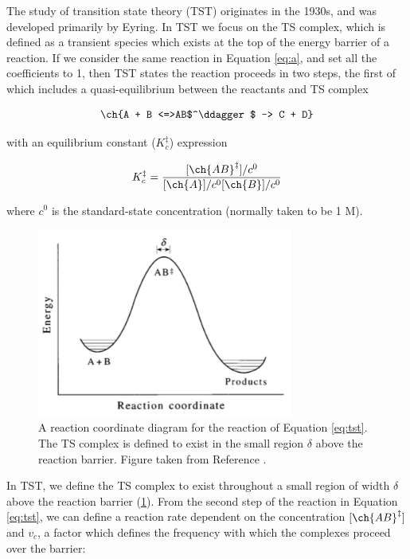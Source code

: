 The study of transition state theory (TST) originates in the 1930s, and was
developed primarily by Eyring.\cite{McQuarrie1997,Steinfeld1998} In TST we focus
on the TS complex, which is defined as a transient species which exists at the
top of the energy barrier of a reaction. If we consider the same reaction in
Equation \ref{eq:a}, and set all the coefficients to 1, then TST states the
reaction proceeds in two steps, the first of which includes a quasi-equilibrium
between the reactants and TS complex

\begin{equation}
  \ch{A + B <=>AB$^\ddagger$ -> C + D}
  \label{eq:tst}
\end{equation}

\noindent with an equilibrium constant ($K_c^{\ddagger}$) expression

\begin{equation}
  K_c^{\ddagger} = \frac{[\ch{AB}^\ddagger]/c^0}{[\ch{A}]/c^0[\ch{B}]/c^0}
\label{eq:K}
\end{equation}

\noindent where $c^0$ is the standard-state concentration (normally taken to be
1 M).

\begin{figure}[htb]
    \centering
    \includegraphics[width=0.75\textwidth]{figures/TST-PES.png}
    \caption[A reaction coordinate diagram for a generic reaction.]{A reaction
      coordinate diagram for the reaction of Equation \ref{eq:tst}. The TS complex is
      defined to exist in the small region $\delta$ above the reaction
      barrier. Figure taken from Reference {\protect{}}.}
    \label{fig:tst-pes}
\end{figure}

In TST, we define the TS complex to exist throughout a small region of width
$\delta$ above the reaction barrier (\ref{fig:tst-pes}). From the second step of
the reaction in Equation \ref{eq:tst}, we can define a reaction rate dependent
on the concentration $[\ch{AB}^\ddagger]$ and $v_c$, a factor which defines the
frequency with which the complexes proceed over the barrier:

